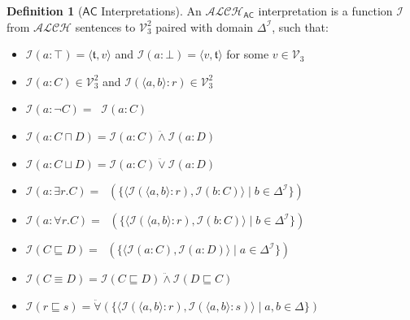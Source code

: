 \documentclass[letterpaper]{article} %
\theoremstyle{definition}
\theoremstyle{definition}
\newtheorem{definition}{Definition}
\theoremstyle{definition}
\theoremstyle{definition}
\theoremstyle{definition}
\newcommand{\strongneg}{\mathord{\sim}}
\newcommand{\isa}{\mathbin{{:}}}
\newcommand{\vt}{\mathfrak{t}}
\begin{document}
\begin{definition}[$\mathsf{AC}$ Interpretations]\label{def:Bilateral-Interp}
	An $\mathcal{ALCH}_\mathsf{AC}$ interpretation is a function $\mathcal{I}$ from $\mathcal{ALCH}$ sentences to $\mathcal{V}_{3}^{2}$ paired with domain $\Delta^{\mathcal{I}}$, such that:
	
	\begin{itemize}
		\item $\mathcal{I}(a\isa\top)=\langle\vt,v\rangle$ and $\mathcal{I}(a\isa\bot)=\langle v,\vt\rangle$ for some $v\in\mathcal{V}_{3}$
		\item $\mathcal{I}(a\isa C)\in\mathcal{V}_{3}^{2}$ and $\mathcal{I}(\langle a,b\rangle\isa r)\in\mathcal{V}_{3}^{2}$
		\item $\mathcal{I}(a\isa\neg C)=\mathop{\ddot{\strongneg}}\mathcal{I}(a\isa C)$
		\item $\mathcal{I}(a\isa C\sqcap D)=\mathcal{I}(a\isa C)\mathrel{\ddot{\wedge}}\mathcal{I}(a\isa D)$
		\item $\mathcal{I}(a\isa C\sqcup D)=\mathcal{I}(a\isa C)\mathrel{\ddot{\vee}}\mathcal{I}(a\isa D)$
		\item $\mathcal{I}(a\isa \exists r.C)=\mathop{\ddot{\exists}}(\lbrace\langle\mathcal{I}(\langle a,b\rangle\isa r),\mathcal{I}(b\isa C)\rangle\mid b\in \Delta^{\mathcal{I}}\rbrace)$
		\item $\mathcal{I}(a\isa \forall r.C)=\mathop{\ddot{\forall}}(\lbrace\langle\mathcal{I}(\langle a,b\rangle\isa r),\mathcal{I}(b\isa C)\rangle\mid b\in \Delta^{\mathcal{I}}\rbrace)$
		\item $\mathcal{I}(C\sqsubseteq D)=\mathop{\ddot{\forall}}(\lbrace\langle\mathcal{I}(a\isa C),\mathcal{I}(a\isa D)\rangle\mid a\in \Delta^{\mathcal{I}}\rbrace)$
		\item $\mathcal{I}(C\equiv D)=\mathcal{I}(C\sqsubseteq D)\mathrel{\ddot{\wedge}}\mathcal{I}(D\sqsubseteq C)$
        \item $\mathcal{I}(r\sqsubseteq s)=\ddot{\forall}(\lbrace \langle\mathcal{I}(\langle a,b\rangle:r),\mathcal{I}(\langle a,b\rangle:s)\rangle\mid a,b\in\Delta\rbrace)$
	\end{itemize}
\end{definition}
\end{document}
